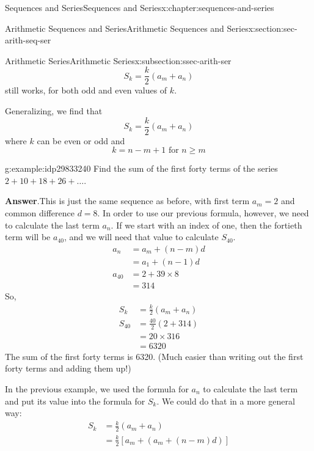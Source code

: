 \documentclass[twoside,10pt,]{book}
\newcommand{\blocktitlefont}{\relax}
\numberwithin{equation}{section}
\newcommand{\amp}{&}
\begin{document}
\begin{chapterptx}{Sequences and Series}{}{Sequences and Series}{}{}{x:chapter:sequences-and-series}
\begin{sectionptx}{Arithmetic Sequences and Series}{}{Arithmetic Sequences and Series}{}{}{x:section:sec-arith-seq-ser}
\begin{subsectionptx}{Arithmetic Series}{}{Arithmetic Series}{}{}{x:subsection:ssec-arith-ser}
\begin{equation*}
S_k = \frac{k}{2}\left( a_m + a_n \right)
\end{equation*}
still works, for both odd and even values of \(k\).%
\par
Generalizing, we find that%
\begin{equation*}
S_k = \frac{k}{2}\left(a_m + a_n \right)
\end{equation*}
where \(k\) can be even or odd and%
\begin{equation*}
k = n - m + 1 \text{   for } n \ge m
\end{equation*}
\begin{example}{}{g:example:idp29833240}%
Find the sum of the first forty terms of the series \(2 + 10 + 18 + 26 + \ldots\).\par\smallskip%
\noindent\textbf{\blocktitlefont Answer}.\label{g:answer:idp29835928}{}\hypertarget{g:answer:idp29835928}{}\quad{}This is just the same sequence as before, with first term \(a_m = 2\) and common difference \(d = 8\).  In order to use our previous formula, however, we need to calculate the last term \(a_n\).  If we start with an index of one, then the fortieth term will be \(a_{40}\), and we will need that value to calculate \(S_{40}\).%
\begin{align*}
a_n \amp = a_m + \left( n - m \right)d\\
\amp = a_1 + \left( n - 1 \right)d\\
a_{40} \amp = 2 + 39 \times 8\\
\amp = 314
\end{align*}
So,%
\begin{align*}
S_k \amp = \frac{k}{2}\left( a_m + a_n \right)\\
S_{40} \amp = \frac{40}{2}\left( 2 + 314 \right)\\
\amp = 20 \times 316\\
\amp = 6320
\end{align*}
The sum of the first forty terms is 6320.  (Much easier than writing out the first forty terms and adding them up!)\end{example}
%
\par
In the previous example, we used the formula for \(a_n\) to calculate the last term and put its value into the formula for \(S_k\).  We could do that in a more general way:%
\begin{align*}
S_k \amp = \frac{k}{2}\left(a_m + a_n \right)\\
\amp = \frac{k}{2}\left[ a_m + \left(a_m + \left(n - m \right)d \right) \right]\\

\end{align*}
\end{subsectionptx}
\end{sectionptx}
\end{chapterptx}
\end{document}
